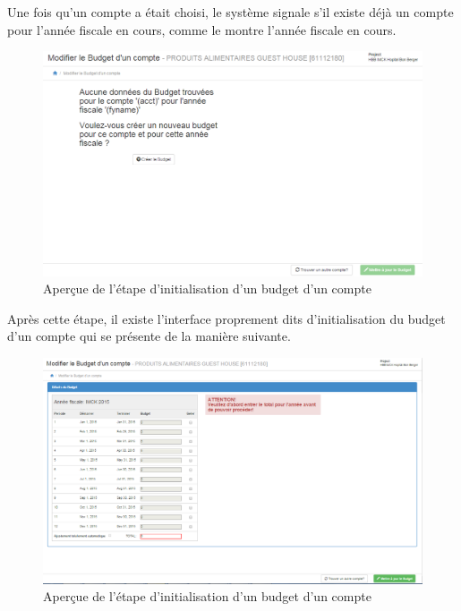 \documentclass[12pt,a4paper]{report}
\begin{document}
Une fois qu'un compte a était choisi, le système signale s'il existe déjà un compte pour l'année fiscale en cours, comme le montre l'année fiscale en cours. 

\begin{figure}[h]
\begin{center}
\includegraphics[width=12cm]{pic/ModBudger1.png}
\end{center}
\caption{Aperçue de l'étape d'initialisation d'un budget d'un compte}
\label{Aperçue de l'étape d'initialisation d'un budget d'un compte}
\end{figure}

\newpage
Après cette étape, il existe l'interface proprement dits d'initialisation du budget d'un compte qui se présente de la manière suivante.

\begin{figure}[h]
\begin{center}
\includegraphics[width=12cm]{pic/ModifierBudgetCompt2.png}
\end{center}
\caption{Aperçue de l'étape d'initialisation d'un budget d'un compte}
\label{Aperçue de l'étape d'initialisation d'un budget d'un compte}
\end{figure}
\end{document}
